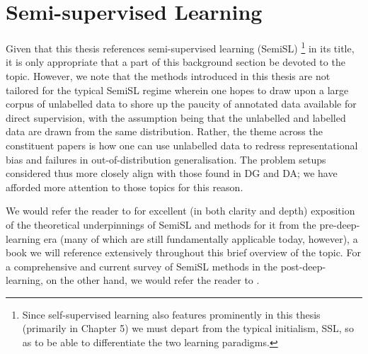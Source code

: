 \section{ Semi-supervised Learning }\label{sec:semisl}
Given that this thesis references semi-supervised learning (SemiSL)
%
\footnote{ Since self-supervised learning also features prominently in this thesis (primarily in
Chapter 5) we must depart from the typical initialism, SSL, so as to be able to differentiate the
two learning paradigms. }
%
in its title, it is only appropriate that a part of this background section be devoted to the
topic.
%
However, we note that the methods introduced in this thesis are not tailored for the typical SemiSL
regime wherein one hopes to draw upon a large corpus of unlabelled data to shore up the paucity of
annotated data available for direct supervision, with the assumption being that the unlabelled and
labelled data are drawn from the same distribution.
%
Rather, the theme across the constituent papers is how one can use unlabelled data to redress
representational bias and failures in out-of-distribution generalisation. 
%
The problem setups considered thus more closely align with those found in DG and DA; we have
afforded more attention to those topics for this reason.

We would refer the reader to \cite{chapelle2009semi} for excellent (in both clarity and depth)
exposition of the theoretical underpinnings of SemiSL and methods for it from the pre-deep-learning
era (many of which are still fundamentally applicable today, however), a book we will reference
extensively throughout this brief overview of the topic.
%
For a comprehensive and current survey of SemiSL methods in the post-deep-learning, on the other
hand, we would refer the reader to \cite{yang2022survey}.
%
%

